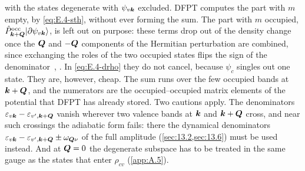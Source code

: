 with the states degenerate with $\psi_{v\bm{k}}$ excluded. DFPT computes the part with $m$ empty, by \cref{eq:E.4-sth}, without ever forming the sum. The part with $m$ occupied, $\hat{P}^{\mathrm{occ}}_{\bm{k}+\bm{Q}}|\partial\psi_{v\bm{k}}\rangle$, is left out on purpose: these terms drop out of the density change once the $\bm{Q}$ and $-\bm{Q}$ components of the Hermitian perturbation are combined, since exchanging the roles of the two occupied states flips the sign of the denominator~\cite[Sect.~II.C]{baroni2001phonons}, \cite[Eq.~(48)]{giustino2017electron}. In \cref{eq:E.4-drho} they do not cancel, because $\psi_c$ singles out one state. They are, however, cheap. The sum runs over the few occupied bands at $\bm{k}+\bm{Q}$, and the numerators are the occupied--occupied matrix elements of the potential that DFPT has already stored. Two cautions apply. The denominators $\varepsilon_{v\bm{k}} - \varepsilon_{v',\bm{k}+\bm{Q}}$ vanish wherever two valence bands at $\bm{k}$ and $\bm{k}+\bm{Q}$ cross, and near such crossings the adiabatic form fails: there the dynamical denominators $\varepsilon_{v\bm{k}} - \varepsilon_{v',\bm{k}+\bm{Q}} \pm \omega_{\bm{Q}\nu}$ of the full amplitude (\cref{sec:13.2,sec:13.6}) must be used instead. And at $\bm{Q} = 0$ the degenerate subspace has to be treated in the same gauge as the states that enter $\rho_{cv}$ (\cref{app:A.5}).

